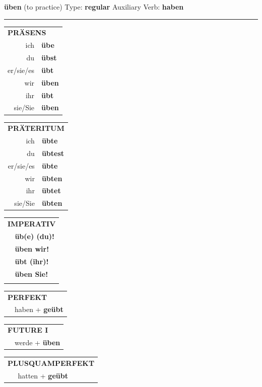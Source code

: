 \documentclass[10pt,a4paper]{revtex4-2}
\begin{document}
\begin{verbbox}
    {\Large \bf üben} (to practice) \hfill Type: \textbf{regular} \hfill Auxiliary Verb: \textbf{haben} 
    
     \vspace{5pt}

    \hrule
    
    \vspace{5pt}

  \begin{tabular}{rl}
     \multicolumn{2}{l}{\textbf{PRÄSENS} }\\
    ich & \textbf{übe}\\
    du & \textbf{übst}\\
    er/sie/es & \textbf{übt}\\
    wir & \textbf{üben}\\
    ihr & \textbf{übt}\\
    sie/Sie & \textbf{üben}\\
  \end{tabular}
  \hfill
     \begin{tabular}{rl}
    \multicolumn{2}{l}{\textbf{PRÄTERITUM} }\\
    ich & \textbf{übte}\\
    du & \textbf{übtest}\\
    er/sie/es & \textbf{übte}\\
    wir & \textbf{übten}\\
    ihr & \textbf{übtet}\\
    sie/Sie & \textbf{übten}\\
  \end{tabular}
  \hfill
  \begin{tabular}{rl}
     \multicolumn{2}{l}{\textbf{IMPERATIV} }\\
   & \textbf{üb(e) (du)!}\\
   & \textbf{üben wir!}\\
   & \textbf{übt (ihr)!}\\
   & \textbf{üben Sie!}\\
   & \vspace{10pt}
  \end{tabular}

    \vspace{10pt}

 \begin{tabular}{rl}
     \multicolumn{2}{l}{\textbf{PERFEKT}}\\
   & haben + \textbf{geübt}\\
  \end{tabular}
\hfill
   \begin{tabular}{rl}
    \multicolumn{2}{l}{\textbf{FUTURE I} }\\
   & werde + \textbf{üben}\\
  \end{tabular}
\hfill
   \begin{tabular}{rl}
      \multicolumn{2}{l}{\textbf{PLUSQUAMPERFEKT}}\\
   & hatten + \textbf{geübt}\\
  \end{tabular}


\end{verbbox}
\end{document}
